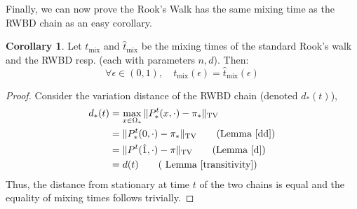 \documentclass{article}
\theoremstyle{definition}
\theoremstyle{definition}
\theoremstyle{definition}
\newtheorem{lemma}{Lemma}
\theoremstyle{definition}
\newtheorem{corollary}{Corollary}
\theoremstyle{named}
\begin{document}


\noindent Finally, we can now prove the Rook's Walk has the same mixing time as the RWBD chain as an easy corollary.
\begin{corollary}
   \label{mixing_time_eq}
     Let $t_\text{mix}$ and $\hat{t}_{\text{mix}}$ be the mixing times of the standard Rook's walk and the RWBD resp. (each with parameters $n,d$). Then:
     \[\forall \epsilon \in (0,1), \quad t_\text{mix}(\epsilon) = \hat{t}_{\text{mix}}(\epsilon)\]
\begin{proof}
   Consider the variation distance of the RWBD chain (denoted $d_*(t)$),
   \begin{align*}
   d_*(t) &=  \max_{x\in \Omega_*}\Vert P^t_*(x,\cdot) - \pi_*  \Vert_\text{TV}\\
    &= \Vert P^t_*(0,\cdot) - \pi_*\Vert_\text{TV} \tag{Lemma \ref{dd}}\\
    &= \Vert P^t(\hat{1},\cdot) - \pi\Vert_\text{TV}\tag{Lemma \ref{d}}\\&=d(t)\tag{ Lemma \ref{transitivity}}
   \end{align*}
Thus, the distance from stationary at time $t$ of the two chains is equal and the equality of mixing times follows trivially.
\end{proof}
\end{corollary}
\end{document}

